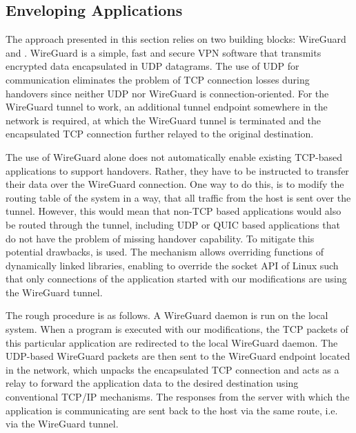 \subsection{Enveloping Applications}
The approach presented in this section relies on two building blocks: WireGuard and \ld.
WireGuard is a simple, fast and secure VPN software that transmits encrypted data encapsulated in UDP datagrams.
The use of UDP for communication eliminates the problem of TCP connection losses during handovers since neither UDP nor WireGuard is connection-oriented.
For the WireGuard tunnel to work, an additional tunnel endpoint somewhere in the network is required, at which the WireGuard tunnel is terminated and the encapsulated TCP connection further relayed to the original destination.

The use of WireGuard alone does not automatically enable existing TCP-based applications to support handovers.
Rather, they have to be instructed to transfer their data over the WireGuard connection.
One way to do this, is to modify the routing table of the system in a way, that all traffic from the host is sent over the tunnel.
However, this would mean that non-TCP based applications would also be routed through the tunnel, including UDP or QUIC based applications that do not have the problem of missing handover capability.
To mitigate this potential drawbacks, \ld is used.
The \ld mechanism allows overriding functions of dynamically linked libraries, enabling to override the socket API of Linux such that only connections of the application started with our \ld modifications are using the WireGuard tunnel.

The rough procedure is as follows.
A WireGuard daemon is run on the local system.
When a program is executed with our modifications, the TCP packets of this particular application are redirected to the local WireGuard daemon.
The UDP-based WireGuard packets are then sent to the WireGuard endpoint located in the network, which unpacks the encapsulated TCP connection and acts as a relay to forward the application data to the desired destination using conventional TCP/IP mechanisms.
The responses from the server with which the application is communicating are sent back to the host via the same route, i.e. via the WireGuard tunnel.

